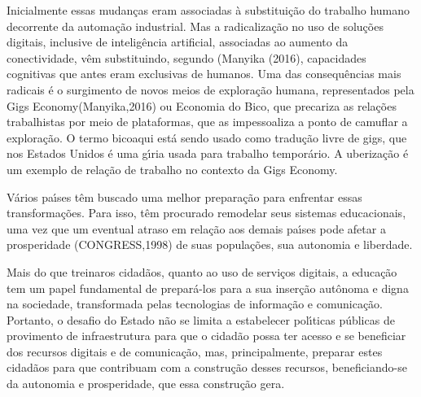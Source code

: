 \documentclass[
12pt,		%
openright,	%
twoside,  %
a4paper,			%
chapter=TITLE,		%
english,			%
french,				%
spanish,			%
brazil				%
]{USPSC-classe/USPSC}
\begin{document}
Inicialmente essas mudan\c{c}as eram associadas \`a substitui\c{c}\~ao do trabalho humano decorrente da automa\c{c}\~ao industrial. Mas a radicaliza\c{c}\~ao no uso de solu\c{c}\~oes digitais, inclusive de intelig\^encia artificial, associadas ao aumento da conectividade, v\^em substituindo, segundo (Manyika (2016), \textquotedbl capacidades cognitivas que antes eram exclusivas de humanos\textquotedbl . Uma das consequ\^encias mais radicais \'e o surgimento de novos meios de explora\c{c}\~ao humana, representados pela \textquotedbl Gigs Economy\textquotedbl  (Manyika,2016) ou \textquotedbl Economia do Bico\textquotedbl , que precariza as rela\c{c}\~oes trabalhistas por meio de plataformas, que as impessoaliza a ponto de camuflar a explora\c{c}\~ao. O termo \textquotedbl bico\textquotedbl  aqui est\'a sendo usado como tradu\c{c}\~ao livre de \textquotedbl gigs\textquotedbl , que nos Estados Unidos \'e uma g\'{\i}ria usada para trabalho tempor\'ario. A uberiza\c{c}\~ao \'e um exemplo de rela\c{c}\~ao de trabalho no contexto da Gigs Economy.

















V\'arios pa\'{\i}ses t\^em buscado uma melhor prepara\c{c}\~ao para enfrentar essas transforma\c{c}\~oes. Para isso, t\^em procurado remodelar seus sistemas educacionais, uma vez que um eventual atraso em rela\c{c}\~ao aos demais pa\'{\i}ses pode afetar a prosperidade (CONGRESS,1998) de suas popula\c{c}\~oes, sua autonomia e liberdade.

















Mais do que \textquotedbl treinar\textquotedbl  os cidad\~aos, quanto ao uso  de servi\c{c}os digitais, a educa\c{c}\~ao tem um papel fundamental de prepar\'a-los para a sua inser\c{c}\~ao aut\^onoma e digna na sociedade, transformada pelas tecnologias de informa\c{c}\~ao e comunica\c{c}\~ao. Portanto, o desafio do Estado n\~ao se limita a estabelecer pol\'{\i}ticas p\'ublicas de provimento de infraestrutura para que o cidad\~ao possa ter acesso e se beneficiar dos recursos digitais e de comunica\c{c}\~ao, mas, principalmente, preparar estes cidad\~aos para que contribuam com a constru\c{c}\~ao desses recursos, beneficiando-se da autonomia e prosperidade, que  essa constru\c{c}\~ao gera.
\end{document}
